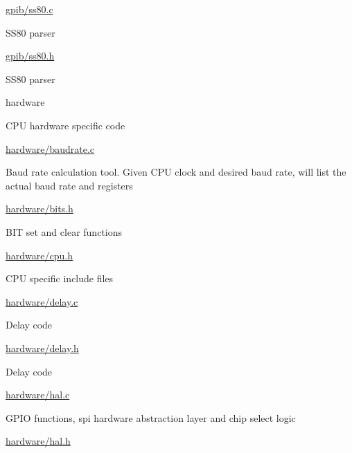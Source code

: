 {\begin{DoxyItemize}
\begin{DoxyItemize}
\begin{DoxyItemize}
\end{DoxyItemize}
\item \hyperlink{ss80_8c}{gpib/ss80.\+c}
\begin{DoxyItemize}
\item S\+S80 parser
\end{DoxyItemize}
\item \hyperlink{ss80_8h}{gpib/ss80.\+h}
\begin{DoxyItemize}
\item S\+S80 parser
\end{DoxyItemize}
\end{DoxyItemize}
\item hardware
\begin{DoxyItemize}
\item C\+PU hardware specific code
\item \hyperlink{baudrate_8c}{hardware/baudrate.\+c}
\begin{DoxyItemize}
\item Baud rate calculation tool. Given C\+PU clock and desired baud rate, will list the actual baud rate and registers
\end{DoxyItemize}
\item \hyperlink{bits_8h}{hardware/bits.\+h}
\begin{DoxyItemize}
\item B\+IT set and clear functions
\end{DoxyItemize}
\item \hyperlink{cpu_8h}{hardware/cpu.\+h}
\begin{DoxyItemize}
\item C\+PU specific include files
\end{DoxyItemize}
\item \hyperlink{delay_8c}{hardware/delay.\+c}
\begin{DoxyItemize}
\item Delay code
\end{DoxyItemize}
\item \hyperlink{delay_8h}{hardware/delay.\+h}
\begin{DoxyItemize}
\item Delay code
\end{DoxyItemize}
\item \hyperlink{hal_8c}{hardware/hal.\+c}
\begin{DoxyItemize}
\item G\+P\+IO functions, spi hardware abstraction layer and chip select logic
\end{DoxyItemize}
\item \hyperlink{hal_8h}{hardware/hal.\+h}

\end{DoxyItemize}
\end{DoxyItemize}}
